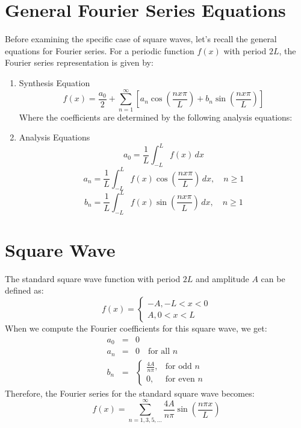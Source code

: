 \documentclass{article}
\begin{document}
\section{General Fourier Series Equations}

Before examining the specific case of square waves, let's recall the general equations for Fourier series. For a periodic function $f(x)$ with period $2L$, the Fourier series representation is given by:

\begin{enumerate}
    \item Synthesis Equation
    \begin{equation}
    f(x) = \frac{a_0}{2} + \sum_{n=1}^{\infty} \left[ a_n \cos\left(\frac{nx\pi}{L}\right) + b_n \sin(\frac{nx\pi}{L}) \right] 
    \end{equation}
Where the coefficients are determined by the following analysis equations:

    \item Analysis Equations
    $$a_0 = \frac{1}{L} \int_{-L}^{L} f(x) \, dx
    \label{a0}$$
$$a_n = \frac{1}{L} \int_{-L}^{L} f(x) \cos\left(\frac{nx\pi}{L}\right) \, dx, \quad n \geq 1$$
$$b_n = \frac{1}{L} \int_{-L}^{L} f(x) \sin\left(\frac{nx\pi}{L}\right) \, dx, \quad n \geq 1
    \label{bn}$$
\end{enumerate}

\section{Square Wave}

The standard square wave function with period $2L$ and amplitude $A$ can be defined as:
\begin{equation}
    f(x) = 
\begin{cases} 
-A,     -L < x < 0 \\
A,      0 < x < L
\end{cases}
    \end{equation}
When we compute the Fourier coefficients for this square wave, we get:
\begin{eqnarray}
a_0 &=& 0 \\
a_n &=& 0 \quad \text{for all } n\\
b_n &=& 
\begin{cases} 
\frac{4A}{n\pi}, & \text{for odd } n \\
0, & \text{for even } n
\end{cases}
\end{eqnarray}
Therefore, the Fourier series for the standard square wave becomes: 
\begin{equation}
    f(x) =  \sum_{n=1,3,5,...}^{\infty} \frac{4A}{n\pi} \sin\left(\frac{n\pi x}{L}\right)
    \end{equation}
\end{document}
